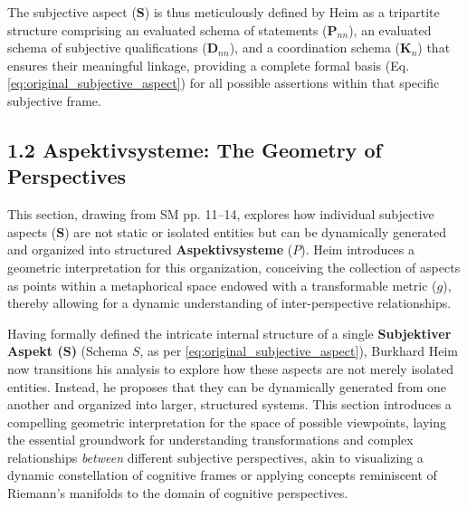 \documentclass[12pt]{article}
\newcommand{\aspektivsystem}{P}
\begin{document}
The subjective aspect (\(\mathbf{S}\)) is thus meticulously defined by Heim as a tripartite structure comprising an evaluated schema of statements (\(\mathbf{P}_{nn}\)), an evaluated schema of subjective qualifications (\(\mathbf{D}_{nn}\)), and a coordination schema (\(\mathbf{K}_n\)) that ensures their meaningful linkage, providing a complete formal basis (Eq. \eqref{eq:original_subjective_aspect}) for all possible assertions within that specific subjective frame.

\subsection{1.2 Aspektivsysteme: The Geometry of Perspectives}
\label{sec:aspektivsysteme}

This section, drawing from SM pp. 11--14, explores how individual subjective aspects (\(\mathbf{S}\)) are not static or isolated entities but can be dynamically generated and organized into structured \textbf{Aspektivsysteme} (\(\aspektivsystem\)). Heim introduces a geometric interpretation for this organization, conceiving the collection of aspects as points within a metaphorical space endowed with a transformable metric (\(g\)), thereby allowing for a dynamic understanding of inter-perspective relationships.

Having formally defined the intricate internal structure of a single \textbf{Subjektiver Aspekt (\(\mathbf{S}\))} (Schema \(S\), as per \eqref{eq:original_subjective_aspect}), Burkhard Heim now transitions his analysis to explore how these aspects are not merely isolated entities. Instead, he proposes that they can be dynamically generated from one another and organized into larger, structured systems. This section introduces a compelling geometric interpretation for the space of possible viewpoints, laying the essential groundwork for understanding transformations and complex relationships \textit{between} different subjective perspectives, akin to visualizing a dynamic constellation of cognitive frames or applying concepts reminiscent of Riemann's manifolds to the domain of cognitive perspectives.
\end{document}
